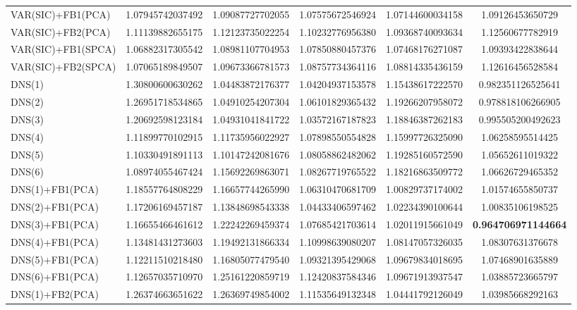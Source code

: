 \begin{table}[htb]
\begin{adjustbox}{totalheight=\baselineskip}
\begin{tabular}{lSSSSS}
VAR(SIC)+FB1(PCA) & 1.07945742037492 & 1.09087727702055 & 1.07575672546924 & 1.07144600034158 & 1.09126453650729 \\ 
VAR(SIC)+FB2(PCA) & 1.11139882655175 & 1.12123735022254 & 1.10232776956380 & 1.09368740093634 & 1.12560677782919 \\ 
VAR(SIC)+FB1(SPCA) & 1.06882317305542 & 1.08981107704953 & 1.07850880457376 & 1.07468176271087 & 1.09393422838644 \\ 
VAR(SIC)+FB2(SPCA) & 1.07065189849507 & 1.09673366781573 & 1.08757734364116 & 1.08814335436159 & 1.12616456528584 \\ 
DNS(1) & 1.30800600630262 & 1.04483872176377 & 1.04204937153578 & 1.15438617222570 & 0.982351126525641 \\ 
DNS(2) & 1.26951718534865 & 1.04910254207304 & 1.06101829365432 & 1.19266207958072 & 0.978818106266905 \\ 
DNS(3) & 1.20692598123184 & 1.04931041841722 & 1.03572167187823 & 1.18846387262183 & 0.995505200492623 \\ 
DNS(4) & 1.11899770102915 & 1.11735956022927 & 1.07898550554828 & 1.15997726325090 & 1.06258595514425 \\ 
DNS(5) & 1.10330491891113 & 1.10147242081676 & 1.08058862482062 & 1.19285160572590 & 1.05652611019322 \\ 
DNS(6) & 1.08974055467424 & 1.15692269863071 & 1.08267719765522 & 1.18216863509772 & 1.06626729465352 \\ 
DNS(1)+FB1(PCA) & 1.18557764808229 & 1.16657744265990 & 1.06310470681709 & 1.00829737174002 & 1.01574655850737 \\ 
DNS(2)+FB1(PCA) & 1.17206169457187 & 1.13848698543338 & 1.04433406597462 & 1.02234390100644 & 1.00835106198525 \\ 
DNS(3)+FB1(PCA) & 1.16655466461612 & 1.22242269459374 & 1.07685421703614 & 1.02011915661049 & \bfseries 0.964706971144664 \\ 
DNS(4)+FB1(PCA) & 1.13481431273603 & 1.19492131866334 & 1.10998639080207 & 1.08147057326035 & 1.08307631376678 \\ 
DNS(5)+FB1(PCA) & 1.12211510218480 & 1.16805077479540 & 1.09321395429068 & 1.09679834018695 & 1.07468901635889 \\ 
DNS(6)+FB1(PCA) & 1.12657035710970 & 1.25161220859719 & 1.12420837584346 & 1.09671913937547 & 1.03885723665797 \\ 
DNS(1)+FB2(PCA) & 1.26374663651622 & 1.26369749854002 & 1.11535649132348 & 1.04441792126049 & 1.03985668292163 \\ 

\end{tabular}
\end{adjustbox}
\end{table}

